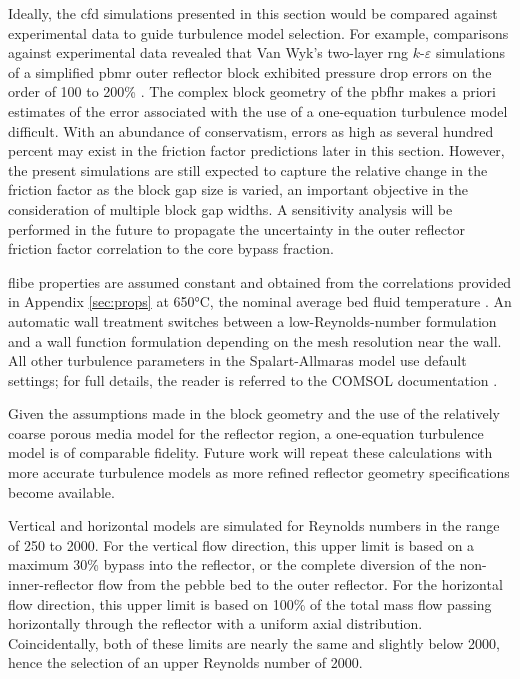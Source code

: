 Ideally, the \gls{cfd} simulations presented in this section would be compared against experimental data to guide turbulence model selection. For example, comparisons against experimental data revealed that Van Wyk's two-layer \gls{rng} \(k\)-\(\varepsilon\) simulations of a simplified \gls{pbmr} outer reflector block exhibited pressure drop errors on the order of 100 to 200\% \cite{wyk}. The complex block geometry of the \gls{pbfhr} makes a priori estimates of the error associated with the use of a one-equation turbulence model difficult. With an abundance of conservatism, errors as high as several hundred percent may exist in the friction factor predictions later in this section. However, the present simulations are still expected to capture the relative change in the friction factor as the block gap size is varied, an important objective in the consideration of multiple block gap widths. A sensitivity analysis will be performed in the future to propagate the uncertainty in the outer reflector friction factor correlation to the core bypass fraction.

\gls{flibe} properties are assumed constant and obtained from the correlations provided in Appendix \ref{sec:props} at 650\si{\celsius}, the nominal average bed fluid temperature \cite{novak_manual}. An automatic wall treatment switches between a low-Reynolds-number formulation and a wall function formulation depending on the mesh resolution near the wall. All other turbulence parameters in the Spalart-Allmaras model use default settings; for full details, the reader is referred to the COMSOL documentation \cite{comsol_cfd}.

Given the assumptions made in the block geometry and the use of the relatively coarse porous media model for the reflector region, a one-equation turbulence model is of comparable fidelity. Future work will repeat these calculations with more accurate turbulence models as more refined reflector geometry specifications become available.

Vertical and horizontal models are simulated for Reynolds numbers in the range of 250 to 2000. For the vertical flow direction, this upper limit is based on a maximum 30\% bypass into the reflector, or the complete diversion of the non-inner-reflector flow from the pebble bed to the outer reflector. For the horizontal flow direction, this upper limit is based on 100\% of the total mass flow passing horizontally through the reflector with a uniform axial distribution. Coincidentally, both of these limits are nearly the same and slightly below 2000, hence the selection of an upper Reynolds number of 2000.

